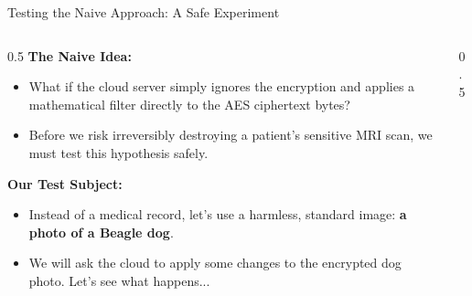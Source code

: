 \documentclass[aspectratio=169, 10pt]{beamer}
\begin{document}
\begin{frame}{Testing the Naive Approach: A Safe Experiment}
    \begin{columns}
        \begin{column}{0.5\textwidth}
            \textbf{The Naive Idea:}
            \begin{itemize}
                \item What if the cloud server simply ignores the encryption and applies a mathematical filter directly to the AES ciphertext bytes?
                \item Before we risk irreversibly destroying a patient's sensitive MRI scan, we must test this hypothesis safely.
            \end{itemize}
            \vspace{0.4cm}
            \textbf{Our Test Subject:}
            \begin{itemize}
                \item Instead of a medical record, let's use a harmless, standard image: \textbf{a photo of a Beagle dog}.
                \item We will ask the cloud to apply some changes to the encrypted dog photo. Let's see what happens...
            \end{itemize}
        \end{column}
        
        \begin{column}{0.5\textwidth}
            \centering
\end{column}
\end{columns}
\end{frame}
\end{document}

